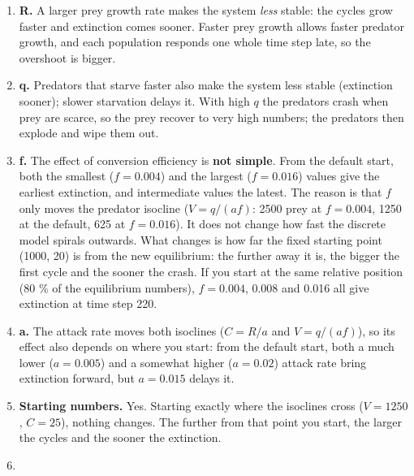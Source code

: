 \documentclass[
  a4paper]{book}
\providecommand{\tightlist}{%
  \setlength{\itemsep}{0pt}\setlength{\parskip}{0pt}}
\begin{document}
\begin{enumerate}
\def\labelenumi{\arabic{enumi}.}
\tightlist
\item
  \textbf{R.} A larger prey growth rate makes the system \emph{less} stable: the cycles grow faster and extinction comes sooner. Faster prey growth allows faster predator growth, and each population responds one whole time step late, so the overshoot is bigger.
\item
  \textbf{q.} Predators that starve faster also make the system less stable (extinction sooner); slower starvation delays it. With high \(q\) the predators crash when prey are scarce, so the prey recover to very high numbers; the predators then explode and wipe them out.
\item
  \textbf{f.} The effect of conversion efficiency is \textbf{not simple}. From the default start, both the smallest (\(f = 0.004\)) and the largest (\(f = 0.016\)) values give the earliest extinction, and intermediate values the latest. The reason is that \(f\) only moves the predator isocline (\(V = q/(af)\): 2500 prey at \(f = 0.004\), 1250 at the default, 625 at \(f = 0.016\)). It does not change how fast the discrete model spirals outwards. What changes is how far the fixed starting point (1000, 20) is from the new equilibrium: the further away it is, the bigger the first cycle and the sooner the crash. If you start at the same relative position (80 \% of the equilibrium numbers), \(f = 0.004\), 0.008 and 0.016 all give extinction at time step 220.
\item
  \textbf{a.} The attack rate moves both isoclines (\(C = R/a\) and \(V = q/(af)\)), so its effect also depends on where you start: from the default start, both a much lower (\(a = 0.005\)) and a somewhat higher (\(a = 0.02\)) attack rate bring extinction forward, but \(a = 0.015\) delays it.
\item
  \textbf{Starting numbers.} Yes. Starting exactly where the isoclines cross (\(V = 1250\), \(C = 25\)), nothing changes. The further from that point you start, the larger the cycles and the sooner the extinction.
\item

\end{enumerate}
\end{document}
